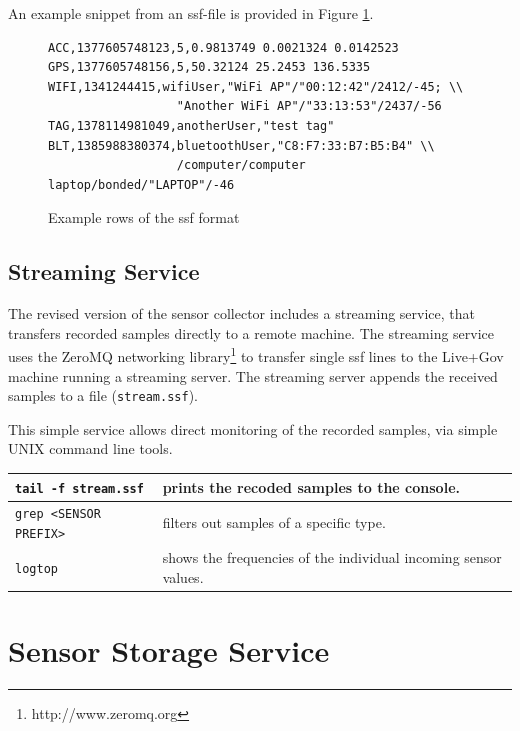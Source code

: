 An example snippet from an ssf-file is provided in Figure \ref{fig:ssf_example}.

\begin{figure}[hb]
\small
\begin{verbatim}
ACC,1377605748123,5,0.9813749 0.0021324 0.0142523
GPS,1377605748156,5,50.32124 25.2453 136.5335
WIFI,1341244415,wifiUser,"WiFi AP"/"00:12:42"/2412/-45; \\
                  "Another WiFi AP"/"33:13:53"/2437/-56
TAG,1378114981049,anotherUser,"test tag"
BLT,1385988380374,bluetoothUser,"C8:F7:33:B7:B5:B4" \\
                  /computer/computer laptop/bonded/"LAPTOP"/-46
\end{verbatim}
\normalsize
\caption{Example rows of the ssf format}
\label{fig:ssf_example}
\end{figure}

\subsection{Streaming Service}\label{sec:straming}

The revised version of the sensor collector includes a streaming
service, that transfers recorded samples directly to a remote machine.
The streaming service uses the ZeroMQ networking
library\footnote{http://www.zeromq.org} to transfer single ssf lines
to the Live+Gov machine running a streaming server. The streaming
server appends the received samples to a file (\texttt{stream.ssf}).

This simple service allows direct monitoring of the recorded samples,
via simple UNIX command line tools. 

\begin{tabular}{|l|l|}\hline
\texttt{tail -f stream.ssf} & prints the recoded samples to the
                              console. \\ \hline
\texttt{grep <SENSOR PREFIX>} & filters out samples of a specific
                                type. \\ \hline
\texttt{logtop}  & shows the frequencies of the individual incoming
                   sensor  values. \\ \hline
\end{tabular}

\section{Sensor Storage Service}


